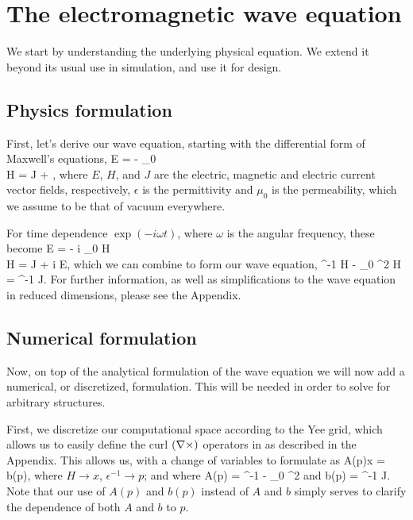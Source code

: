 \section{The electromagnetic wave equation}

We start by understanding the underlying physical equation.
We extend it beyond its usual use in simulation, 
    and use it for design.

\subsection{Physics formulation}
First, let's derive our wave equation,
    starting with the differential form of Maxwell's equations, 
\BA \curl E = - \mu_0  \\
    \curl H = J + \epsilon {}, \EA
    where $E$, $H$, and $J$ are 
    the electric, magnetic and electric current %
    vector fields, respectively,
    $\epsilon$ is the permittivity
    and $\mu_0$ is the permeability, which we assume to be 
    that of vacuum everywhere.


For time dependence $\exp(-i \omega t)$, 
    where $\omega$ is the angular frequency,
    these become
\BA \curl E = - i \mu_0 \omega H \\
    \curl H = J + i \epsilon \omega E, \label{eq:H2E} \EA
    which we can combine to form our wave equation,
\BE \curl \epsilon^{-1} \curl H - \mu_0 \omega^2 H = \curl \epsilon^{-1} J. 
    \label{eq:wave} \EE
For further information,
    as well as simplifications to the wave equation in reduced dimensions,
    please see the Appendix. %

\subsection{Numerical formulation}
Now, on top of the analytical formulation of the wave equation 
    we will now add a numerical, or discretized, formulation.
This will be needed in order to solve for arbitrary structures.

First, we discretize our computational space 
    according to the Yee grid, %
    which allows us to easily define the curl $(\nabla\times)$
    operators in  as described in the Appendix. %
This allows us, with a change of variables to formulate  as
\BE A(p)x = b(p), \label{eq:Ab} \EE 
    where $H \to x$, $\epsilon^{-1} \to p$; 
    and where
\BE A(p) = \curl \epsilon^{-1} \curl - \mu_0 \omega^2 \EE 
    and
\BE b(p) = \curl \epsilon^{-1} J. \EE
Note that our use of $A(p)$ and $b(p)$ instead of $A$ and $b$
    simply serves to clarify the dependence
    of both $A$ and $b$ to $p$.

